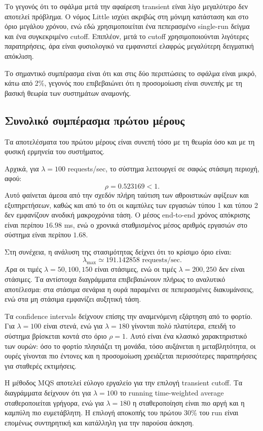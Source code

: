 \documentclass{article}
\begin{document}
Το γεγονός ότι το σφάλμα μετά την αφαίρεση transient είναι λίγο μεγαλύτερο δεν αποτελεί πρόβλημα. Ο νόμος Little ισχύει ακριβώς στη μόνιμη κατάσταση και στο όριο μεγάλου χρόνου, ενώ εδώ χρησιμοποιείται ένα πεπερασμένο single-run δείγμα και ένα συγκεκριμένο cutoff. Επιπλέον, μετά το cutoff χρησιμοποιούνται λιγότερες παρατηρήσεις, άρα είναι φυσιολογικό να εμφανιστεί ελαφρώς μεγαλύτερη δειγματική απόκλιση.

Το σημαντικό συμπέρασμα είναι ότι και στις δύο περιπτώσεις το σφάλμα είναι μικρό, κάτω από 2\%, γεγονός που επιβεβαιώνει ότι η προσομοίωση είναι συνεπής με τη βασική θεωρία των συστημάτων αναμονής.

\subsection{Συνολικό συμπέρασμα πρώτου μέρους}

Τα αποτελέσματα του πρώτου μέρους είναι συνεπή τόσο με τη θεωρία όσο και με τη φυσική ερμηνεία του συστήματος.

Αρχικά, για $\lambda=100$ requests/sec, το σύστημα λειτουργεί σε σαφώς στάσιμη περιοχή, αφού:
\[
    \rho = 0.523169 < 1.
\]
Αυτό φαίνεται άμεσα από την σχεδόν πλήρη ταύτιση των αθροιστικών αφίξεων και εξυπηρετήσεων, καθώς και από το ότι οι καμπύλες των εργασιών τύπου 1 και τύπου 2 δεν εμφανίζουν ανοδική μακροχρόνια τάση. Ο μέσος end-to-end χρόνος απόκρισης είναι περίπου $16.98$ ms, ενώ ο χρονικά σταθμισμένος μέσος αριθμός εργασιών στο σύστημα είναι περίπου $1.68$.

Στη συνέχεια, η ανάλυση της στασιμότητας δείχνει ότι το κρίσιμο όριο είναι:
\[
    \lambda_{\max} \simeq 191.142858 \text{ requests/sec}.
\]
Άρα οι τιμές $\lambda=50,100,150$ είναι στάσιμες, ενώ οι τιμές $\lambda=200,250$ δεν είναι στάσιμες. Τα αντίστοιχα διαγράμματα επιβεβαιώνουν πλήρως το αναλυτικό αποτέλεσμα: στα στάσιμα σενάρια η ουρά παραμένει σε πεπερασμένες διακυμάνσεις, ενώ στα μη στάσιμα εμφανίζει αυξητική τάση.

Τα confidence intervals δείχνουν επίσης την αναμενόμενη εξάρτηση από το φορτίο. Για $\lambda=100$ είναι στενά, ενώ για $\lambda=180$ γίνονται πολύ πλατύτερα, επειδή το σύστημα βρίσκεται κοντά στο όριο $\rho=1$. Αυτό είναι ένα κλασικό χαρακτηριστικό των ουρών: όσο το φορτίο πλησιάζει τη μονάδα, τόσο αυξάνεται η μεταβλητότητα, οι ουρές γίνονται πιο έντονες και η προσομοίωση χρειάζεται περισσότερες παρατηρήσεις για σταθερές εκτιμήσεις.

Η μέθοδος MQS αποτελεί εύλογο εργαλείο για την επιλογή transient cutoff. Τα διαγράμματα δείχνουν ότι για $\lambda=100$ το running time-weighted average σταθεροποιείται γρήγορα, ενώ για $\lambda=180$ η σταθεροποίηση είναι πιο αργή και η καμπύλη πιο ευμετάβλητη. Η επιλογή αποκοπής του πρώτου 30\% του run είναι επομένως συντηρητική και κατάλληλη για την παρούσα άσκηση.
\end{document}
